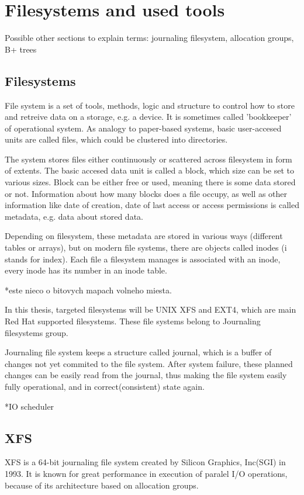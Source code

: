 \documentclass[
  color, %
  table, %
  lof,   %
  lot,   %
]{fithesis3}
\begin{document}
\chapter{Filesystems and used tools}
Possible other sections to explain terms: journaling filesystem, allocation groups, B+ trees
\section{Filesystems}
File system is a set of tools, methods, logic and structure to control how to store and retreive data on a storage, e.g. a device. It is sometimes called 'bookkeeper' of operational system.
As analogy to paper-based systems, basic user-accesed units are called files, which could be clustered into directories.

The system stores files either continuously or scattered across filesystem in form of extents. The basic accesed data unit is called a block, which size can be set to various sizes. Block can be either free or used, meaning there is some data stored or not. Information about how many blocks does a file occupy, as well as other information like date of creation, date of last access or access permissions is called metadata, e.g. data about stored data.

Depending on filesystem, these metadata are stored in various ways (different tables or arrays), but on modern file systems, there are objects called inodes (i stands for index). Each file a filesystem manages is associated with an inode, every inode has its number in an inode table.

*este nieco o bitovych mapach volneho miesta.

In this thesis, targeted filesystems will be UNIX XFS and EXT4, which are main Red Hat supported filesystems. These file systems belong to Journaling filesystems group.

Journaling file system keeps a structure called journal, which is a buffer of changes not yet commited to the file system. After system failure, these planned changes can be easily read from the journal, thus making the file system easily fully operational, and in correct(consistent) state again.

*IO scheduler
\section{XFS}
XFS is a 64-bit journaling file system created by Silicon Graphics, Inc(SGI) in 1993. It is known for great performance in execution of paralel I/O operations, because of its architecture based on allocation groups.
\end{document}
